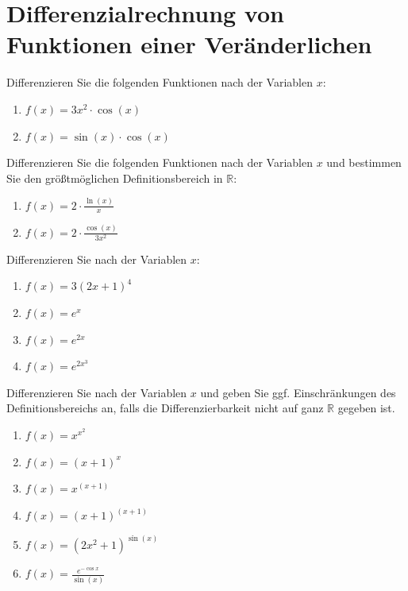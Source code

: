 \section{Differenzialrechnung von Funktionen einer
Veränderlichen}

\begin{ejercicio}
    Differenzieren Sie die folgenden Funktionen nach der Variablen $x$:
    \begin{enumerate}
        \item $f(x) = 3x^2 \cdot \cos(x)$
        \item $f(x) = \sin(x) \cdot \cos(x)$
    \end{enumerate}
\end{ejercicio}

\begin{ejercicio}[Quotientenregel]
    Differenzieren Sie die folgenden Funktionen nach der Variablen $x$ und bestimmen Sie den größtmöglichen Definitionsbereich in $\mathbb{R}$:
    \begin{enumerate}
        \item $f(x) = 2 \cdot \frac{\ln(x)}{x}$
        \item $f(x) = 2 \cdot \frac{\cos(x)}{3x^2}$
    \end{enumerate}
\end{ejercicio}

\begin{ejercicio}[Kettenregel]
    Differenzieren Sie nach der Variablen $x$:
    \begin{enumerate}
        \item $f(x) = 3 (2x + 1)^4$
        \item $f(x) = e^x$
        \item $f(x) = e^{2x}$
        \item $f(x) = e^{2x^3}$
    \end{enumerate}
\end{ejercicio}

\begin{ejercicio}
    Differenzieren Sie nach der Variablen $x$ und geben Sie ggf. Einschränkungen des Definitionsbereichs an, falls die Differenzierbarkeit nicht auf ganz $\mathbb{R}$ gegeben ist.
    \begin{enumerate}
        \item $f(x) = x^{x^2}$
        \item $f(x) = (x + 1)^x$
        \item $f(x) = x^{(x+1)}$
        \item $f(x) = (x + 1)^{(x+1)}$
        \item $f(x) = \left(2x^2+1\right)^{\sin(x)}$
        \item $f(x) = \frac{e^{-\cos x}}{\sin(x)}$
    \end{enumerate}
\end{ejercicio}

